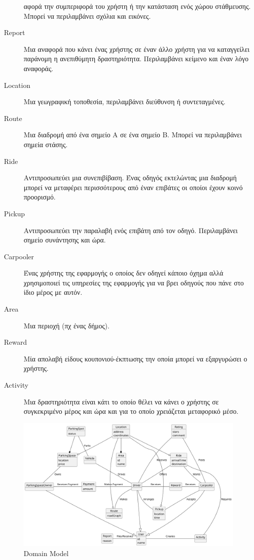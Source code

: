 \documentclass[11pt]{article}
\begin{document}
\begin{description}
        αφορά την συμπεριφορά του χρήστη ή την κατάσταση ενός χώρου
        στάθμευσης. Μπορεί να περιλαμβάνει σχόλια και εικόνες.
    \item[Report]
        Μια αναφορά που κάνει ένας χρήστης σε έναν άλλο χρήστη για να
        καταγγείλει παράνομη η ανεπιθύμητη δραστηριότητα. Περιλαμβάνει
        κείμενο και έναν λόγο αναφοράς.
    \item[Location]
        Μια γεωγραφική τοποθεσία, περιλαμβάνει διεύθυνση ή συντεταγμένες.
    \item[Route]
        Μια διαδρομή από ένα σημείο Α σε ένα σημείο Β. Μπορεί να περιλαμβάνει
        σημεία στάσης.
    \item[Ride]
        Αντιπροσωπεύει μια συνεπιβίβαση. Ένας οδηγός εκτελώντας μια διαδρομή
        μπορεί να μεταφέρει περισσότερους από έναν επιβάτες οι οποίοι έχουν
        κοινό προορισμό.
    \item[Pickup]
        Αντιπροσωπεύει την παραλαβή ενός επιβάτη από τον οδηγό. Περιλαμβάνει
        σημείο συνάντησης και ώρα.
    \item[Carpooler]
        Ένας χρήστης της εφαρμογής ο οποίος δεν οδηγεί κάποιο όχημα αλλά
        χρησιμοποιεί τις υπηρεσίες της εφαρμογής για να βρει οδηγούς που πάνε
        στο ίδιο μέρος με αυτόν.
    \item[Area]
        Μια περιοχή (πχ ένας δήμος).
    \item[Reward]
        Μία απολαβή είδους κουπονιού-έκπτωσης την οποία μπορεί να εξαργυρώσει
        ο χρήστης.
    \item[Activity]
        Μια δραστηριότητα είναι κάτι το οποίο θέλει να κάνει ο χρήστης σε
        συγκεκριμένο μέρος και ώρα και για το οποίο χρειάζεται μεταφορικό μέσο.
\end{description}

\begin{figure}
    \centering
    \includegraphics[width=\textwidth]{domain-model}
    \caption{Domain Model}
\end{figure}
\end{document}
